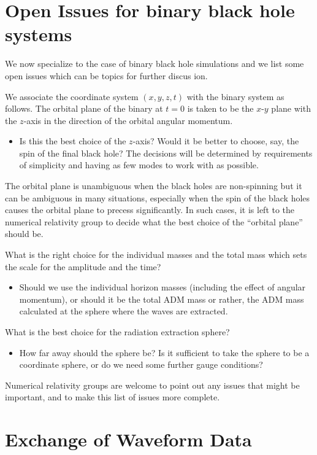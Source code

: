 \documentclass[10pt]{ligodcc}
\begin{document}
\section{Open Issues for binary black hole systems}
\label{sec:openissues}

We now specialize to the case of binary black hole simulations and we
list some open issues which can be topics for further discus ion.  

We associate the coordinate system $(x,y,z,t)$ with the binary system
as follows.  The orbital plane of the binary at $t=0$ is taken to be
the $x$-$y$ plane with the $z$-axis in the direction of the orbital
angular momentum.
\begin{itemize}
\item Is this the best choice of the $z$-axis?  Would it be better to
  choose, say, the spin of the final black hole? The decisions will be
  determined by requirements of simplicity and having as few modes to
  work with as possible.  
\end{itemize}
The orbital plane is unambiguous when the black holes are non-spinning
but it can be ambiguous in many situations, especially when the spin
of the black holes causes the orbital plane to precess significantly.
In such cases, it is left to the numerical relativity group to decide
what the best choice of the ``orbital plane'' should be. 

What is the right choice for the individual masses and the total mass
which sets the scale for the amplitude and the time?
\begin{itemize}
\item Should we use the individual horizon masses (including the
  effect of angular momentum), or should it be the total ADM mass or
  rather, the ADM mass calculated at the sphere where the waves are
  extracted.  
\end{itemize}

What is the best choice for the radiation extraction sphere?
\begin{itemize}
\item How far away should the sphere be?  Is it sufficient to take the
  sphere to be a coordinate sphere, or do we need some further gauge
  conditions?  
\end{itemize}

Numerical relativity groups are welcome to point out any issues that
might be important, and to make this list of issues more complete.  


\section{Exchange of Waveform Data}
\label{sec:authorship}
\end{document}
